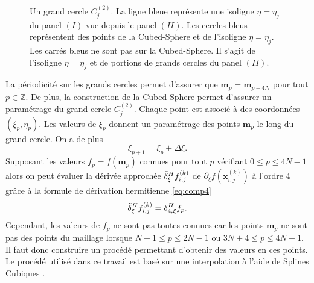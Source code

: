\begin{figure}[htbp]
\begin{center}
\end{center}
\caption{Un grand cercle $C_j^{(2)}$. La ligne bleue représente une isoligne $\eta=\eta_j$ du panel $(I)$ vue depuis le panel $(II)$. Les cercles bleus représentent des points de la Cubed-Sphere et de l'isoligne $\eta=\eta_j$. Les carrés bleus ne sont pas sur la Cubed-Sphere. Il s'agit de l'isoligne $\eta = \eta_j$ et de portions de grands cercles du panel $(II)$.}
\label{fig: panel II_interp}
\end{figure}  

La périodicité sur les grands cercles permet d'assurer que $\mathbf{m}_p = \mathbf{m}_{p+4N}$ pour tout $p \in \mathbb{Z}$. De plus, la construction de la Cubed-Sphere permet d'assurer un paramétrage du grand cercle $C^{(2)}_j$. Chaque point est associé à des coordonnées $(\xi_p, \eta_p)$. Les valeurs de $\xi_p$ donnent un paramétrage des points $\mathbf{m}_p$ le long du grand cercle. On a de plus
\begin{equation}
\xi_{p+1} = \xi_p + \Delta \xi.
\end{equation}
Supposant les valeurs $f_p = f(\mathbf{m}_p)$ connues pour tout $p$ vérifiant $0 \leq p \leq 4N-1$ alors on peut évaluer la dérivée approchée $\tilde{\delta}^H_{\xi} f_{i,j}^{(k)}$ de $\partial_{\xi}f(\mathbf{x}_{i,j}^{(k)})$ à l'ordre $4$ grâce à la formule de dérivation hermitienne \eqref{eq:comp4}
\begin{equation}
\tilde{\delta}^H_{\xi} f_{i,j}^{(k)} = \delta_{4,\xi}^H f_p.
\end{equation}
Cependant, les valeurs de $f_p$ ne sont pas toutes connues car les points $\mathbf{m}_p$ ne sont pas des points du maillage lorsque $N+1 \leq p \leq 2N-1$ ou $3N+4 \leq p \leq 4N-1$. Il faut donc construire un procédé permettant d'obtenir des valeurs en ces points. Le procédé utilisé dans ce travail est basé sur une interpolation à l'aide de Splines Cubiques \cite{Ahlberg2016}.

